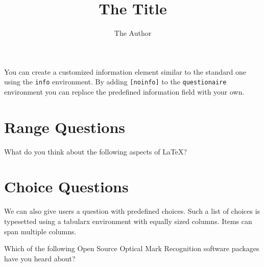 \documentclass[
  english,
  ]{sdapsclassic}
\author{The Author}
\title{The Title}
\begin{document}

  \begin{questionnaire}
    \begin{info}
      You can create a customized information element similar to the standard
      one using the \texttt{info} environment. By adding \texttt{[noinfo]} to
      the \texttt{questionaire} environment you can replace the predefined
      information field with your own.
    \end{info}


    \section{Range Questions}


    \begin{markgroup}{What do you think about the following aspects of \LaTeX?}
    \end{markgroup}

    \section{Choice Questions}
    We can also give users a question with predefined choices. Such a list
    of choices is typesetted using a tabularx environment with equally
    sized columns. Items can span multiple columns.

    \begin{choicequestion}[cols=3]{Which of the following Open Source
                                   Optical Mark Recognition software
                                   packages have you heard about?}


\end{choicequestion}
\end{questionnaire}
\end{document}
